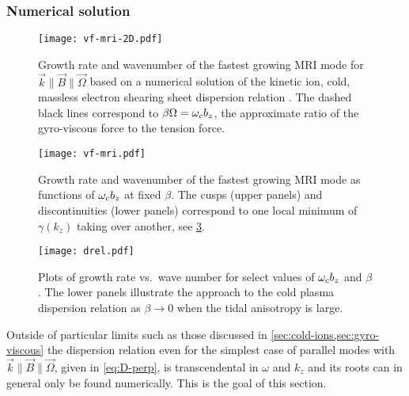 \documentclass[aps,pre,notitlepage,amsmath,amssymb,amsfonts,nobibnotes,nofootinbib,superscriptaddress]{revtex4-1}
\begin{document}
\subsubsection{Numerical solution}

\begin{figure}
  \centering\texttt{[image: vf-mri-2D.pdf]}
  \caption{Growth rate and wavenumber of the fastest growing MRI mode for
    $\vec{k}\bm{\parallel}\vec{B}\bm{\parallel}\vec{\Omega}$ based on a
    numerical solution of the kinetic ion, cold, massless electron shearing
    sheet dispersion relation . The dashed black lines
    correspond to $\beta\Omega=\omega_c{}b_z$, the approximate ratio of the
    gyro-viscous force to the tension force.}\label{fig:vf-mri-2D}
\end{figure}

\begin{figure}
  \centering\texttt{[image: vf-mri.pdf]}
  \caption{Growth rate and wavenumber of the fastest growing MRI mode as
    functions of $\omega_c{}b_z$ at fixed $\beta$. The cusps (upper panels) and
    discontinuities (lower panels) correspond to one local minimum of
    $\gamma(k_z)$ taking over another, see \cref{fig:drel}.}\label{fig:vf-mri}
\end{figure}

\begin{figure}
  \centering\texttt{[image: drel.pdf]}
  \caption{Plots of
    growth rate vs.\ wave number for select values of $\omega_c{}b_z$ and $\beta$.
    The lower panels illustrate the approach to the cold plasma dispersion
    relation as $\beta\to0$ when the tidal anisotropy is
    large.}\label{fig:drel}
\end{figure}

Outside of particular limits such as those discussed in
\cref{sec:cold-ions,sec:gyro-viscous} the dispersion relation even for the
simplest case of parallel modes with
$\vec{k}\bm{\parallel}\vec{B}\bm{\parallel}\vec{\Omega}$, given in
\cref{eq:D-perp}, is transcendental in $\omega$ and $k_z$ and its roots can in
general only be found numerically. This is the goal of this section.
\end{document}
